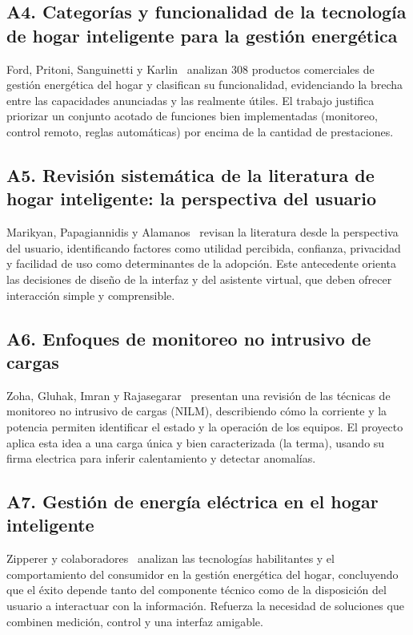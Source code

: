 \documentclass[11pt,a4paper]{article}
\begin{document}
\subsection*{A4. Categorías y funcionalidad de la tecnología de hogar inteligente para la gestión energética}
Ford, Pritoni, Sanguinetti y Karlin~\cite{ford2017} analizan 308 productos comerciales de gestión energética del hogar y clasifican su funcionalidad, evidenciando la brecha entre las capacidades anunciadas y las realmente útiles. El trabajo justifica priorizar un conjunto acotado de funciones bien implementadas (monitoreo, control remoto, reglas automáticas) por encima de la cantidad de prestaciones.

\subsection*{A5. Revisión sistemática de la literatura de hogar inteligente: la perspectiva del usuario}
Marikyan, Papagiannidis y Alamanos~\cite{marikyan2019} revisan la literatura desde la perspectiva del usuario, identificando factores como utilidad percibida, confianza, privacidad y facilidad de uso como determinantes de la adopción. Este antecedente orienta las decisiones de diseño de la interfaz y del asistente virtual, que deben ofrecer interacción simple y comprensible.

\subsection*{A6. Enfoques de monitoreo no intrusivo de cargas}
Zoha, Gluhak, Imran y Rajasegarar~\cite{zoha2012} presentan una revisión de las técnicas de monitoreo no intrusivo de cargas (NILM), describiendo cómo la corriente y la potencia permiten identificar el estado y la operación de los equipos. El proyecto aplica esta idea a una carga única y bien caracterizada (la terma), usando su firma electrica para inferir calentamiento y detectar anomalías.

\subsection*{A7. Gestión de energía eléctrica en el hogar inteligente}
Zipperer y colaboradores~\cite{zipperer2013} analizan las tecnologías habilitantes y el comportamiento del consumidor en la gestión energética del hogar, concluyendo que el éxito depende tanto del componente técnico como de la disposición del usuario a interactuar con la información. Refuerza la necesidad de soluciones que combinen medición, control y una interfaz amigable.
\end{document}

